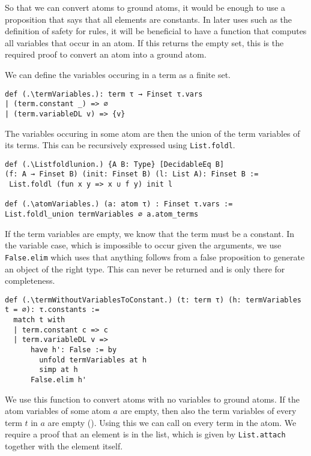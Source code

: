 So that we can convert atoms to ground atoms, it would be enough to use a proposition that says that all elements are constants. In later uses such as the definition of safety for rules, it will be beneficial to have a function that computes all variables that occur in an atom. If this returns the empty set, this is the required proof to convert an atom into a ground atom. 

We can define the variables occuring in a term as a finite set.

\begin{lstlisting}
def (.\termVariables.): term τ → Finset τ.vars
| (term.constant _) => ∅
| (term.variableDL v) => {v}
\end{lstlisting}

The variables occuring in some atom are then the union of the term variables of its terms. This can be recursively expressed using \lstinline|List.foldl|.

\begin{lstlisting}
def (.\Listfoldlunion.) {A B: Type} [DecidableEq B]  
(f: A → Finset B) (init: Finset B) (l: List A): Finset B :=
 List.foldl (fun x y => x ∪ f y) init l

def (.\atomVariables.) (a: atom τ) : Finset τ.vars := 
List.foldl_union termVariables ∅ a.atom_terms
\end{lstlisting}

If the term variables are empty, we know that the term must be a constant. In the variable case, which is impossible to occur given the arguments, we use \lstinline|False.elim| which uses that anything follows from a false proposition to generate an object of the right type. This can never be returned and is only there for completeness.

\begin{lstlisting}
def (.\termWithoutVariablesToConstant.) (t: term τ) (h: termVariables t = ∅): τ.constants :=
  match t with
  | term.constant c => c
  | term.variableDL v =>
      have h': False := by
        unfold termVariables at h
        simp at h
      False.elim h'
\end{lstlisting}

We use this function to convert atoms with no variables to ground atoms. If the atom variables of some atom $a$ are empty, then also the term variables of every term $t$ in $a$ are empty (\atomVariablesEmptyIffAllTermVariablesEmpty). Using this we can call \termWithoutVariablesToConstant on every term in the atom. We require a proof that an element is in the list, which is given by \lstinline|List.attach| together with the element itself.

